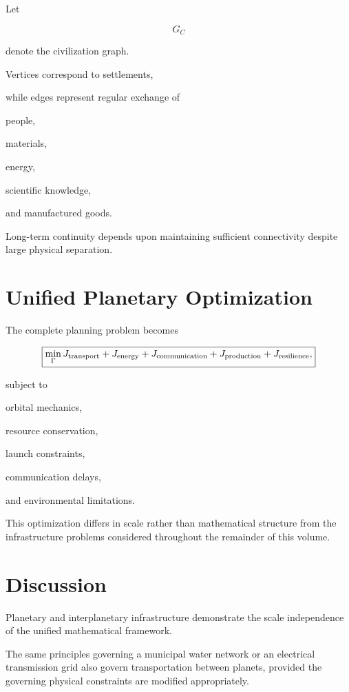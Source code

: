 \documentclass[11pt,fleqn]{book}
\numberwithin{equation}{chapter}
\theoremstyle{plain}
\theoremstyle{definition}
\theoremstyle{remark}
\begin{document}
Let

\[
G_C
\]

denote the civilization graph.

Vertices correspond to settlements,

while edges represent regular exchange of

people,

materials,

energy,

scientific knowledge,

and manufactured goods.

Long-term continuity depends upon maintaining sufficient connectivity
despite large physical separation.


\section{Unified Planetary Optimization}

The complete planning problem becomes

\[
\boxed{
\min_{\Gamma}
J_{\rm transport}
+
J_{\rm energy}
+
J_{\rm communication}
+
J_{\rm production}
+
J_{\rm resilience},
}
\]

subject to

orbital mechanics,

resource conservation,

launch constraints,

communication delays,

and environmental limitations.

This optimization differs in scale rather than mathematical structure
from the infrastructure problems considered throughout the remainder of
this volume.


\section{Discussion}

Planetary and interplanetary infrastructure demonstrate the scale
independence of the unified mathematical framework.

The same principles governing a municipal water network or an electrical
transmission grid also govern transportation between planets, provided
the governing physical constraints are modified appropriately.
\end{document}
